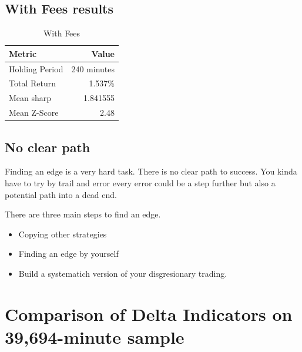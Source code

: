 \documentclass[12pt]{article}
\begin{document}
\subsection{With Fees results}


\begin{table}[H]
  \centering
  \caption{With Fees}
  \label{tab:backtest_results_fees}
  \begin{tabular}{@{}lr@{}}
    \toprule
    Metric & Value \\
    \midrule
    Holding Period & 240 minutes \\
    Total Return & 1.537\% \\
    Mean sharp & 1.841555 \\
    Mean Z-Score & 2.48 \\

    \bottomrule
  \end{tabular}
\end{table}








\subsection{No clear path}
Finding an edge is a very hard task. There is no clear path to success. You kinda have to try by trail and error every error could be a step further but also a potential path into a dead end.
  
There are three main steps to find an edge. 
\begin{itemize}
  \item Copying other strategies
  \item Finding an edge by yourself
  \item Build a systematich version of your disgresionary trading.
\end{itemize}










\newpage
\section{Comparison of Delta Indicators on 39,694-minute sample}
\end{document}
